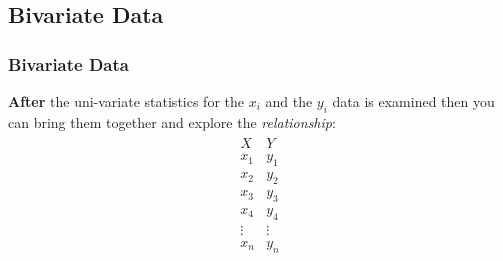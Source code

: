 \subsection{Bivariate Data}


\begin{frame}
  \frametitle{Bivariate Data}

  \textbf{\color{red}After} the uni-variate statistics for the $x_i$ and the
  $y_i$ data is examined then you can bring them together and explore
  the \textit{relationship}:
  \begin{eqnarray*}
    \begin{array}{l|l}
      X & Y \\ \hline
      x_1 & y_1 \\
      x_2 & y_2 \\
      x_3 & y_3 \\
      x_4 & y_4 \\
      \vdots & \vdots \\
      x_n & y_n
  \end{array}
\end{eqnarray*}

\end{frame}


